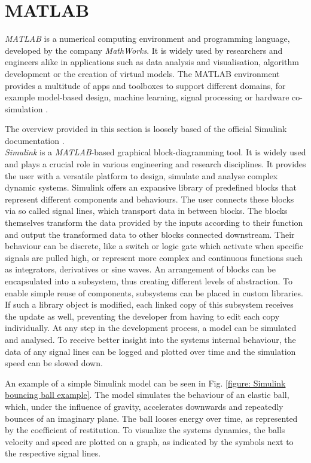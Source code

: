 \section{MATLAB}
\textit{MATLAB\textsuperscript{\textregistered}} is a numerical computing environment and programming language, developed by the company \textit{MathWorks\textsuperscript{\textregistered}}.
It is widely used by researchers and engineers alike in applications such as data analysis and visualisation, algorithm development or the creation of virtual models.
The MATLAB environment provides a multitude of apps and toolboxes to support different domains, for example model-based design, machine learning, signal processing or hardware co-simulation \parencite{MATLAB}.

The overview provided in this section is loosely based of the official Simulink documentation \parencite{matlabSimulinkDocumention}.\\
\textit{Simulink\textsuperscript{\textregistered}} is a \textit{MATLAB\textsuperscript{\textregistered}}-based graphical block-diagramming tool. 
It is widely used and plays a crucial role in various engineering and research disciplines.
It provides the user with a versatile platform to design, simulate and analyse complex dynamic systems.
Simulink offers an expansive library of predefined blocks that represent different components and behaviours.
The user connects these blocks via so called signal lines, which transport data in between blocks.
The blocks themselves transform the data provided by the inputs according to their function and output the transformed data to other blocks connected downstream.
Their behaviour can be discrete, like a switch or logic gate which activate when specific signals are pulled high, or represent more complex and continuous functions such as integrators, derivatives or sine waves.
An arrangement of blocks can be encapsulated into a subsystem, thus creating different levels of abstraction.
To enable simple reuse of components, subsystems can be placed in custom libraries.
If such a library object is modified, each linked copy of this subsystem receives the update as well, preventing the developer from having to edit each copy individually.
At any step in the development process, a model can be simulated and analysed.
To receive better insight into the systems internal behaviour, the data of any signal lines can be logged and plotted over time and the simulation speed can be slowed down.

An example of a simple Simulink model can be seen in Fig. \ref{figure: Simulink bouncing ball example}.
The model simulates the behaviour of an elastic ball, which, under the influence of gravity, accelerates downwards and repeatedly bounces of an imaginary plane.
The ball looses energy over time, as represented by the coefficient of restitution.
To visualize the systems dynamics, the balls velocity and speed are plotted on a graph, as indicated by the symbols next to the respective signal lines.

